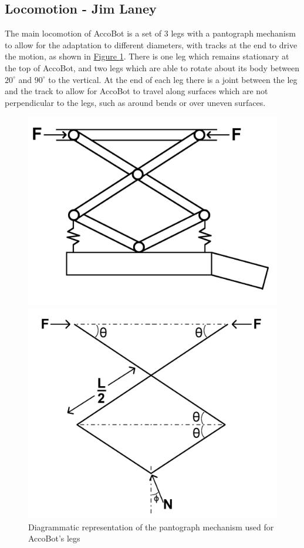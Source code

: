 \documentclass[11pt]{article}		%
\newlength{\imageheight}	 %
\newcommand{\figref}[1]{\hyperref[#1]{Figure \ref*{#1}}}    %
\begin{document}
		\subsection[Locomotion]{Locomotion - Jim Laney}
			The main locomotion of AccoBot is a set of 3 legs with a pantograph mechanism  to allow for the adaptation to different diameters, with tracks at the end to drive the motion, as shown in \figref{legDesign}.
			There is one leg which remains stationary at the top of AccoBot, and two legs which are able to rotate about its body between $20^\circ$ and $90^\circ$ to the vertical.
			At the end of each leg there is a joint between the leg and the track to allow for AccoBot to travel along surfaces which are not perpendicular to the legs, such as around bends or over uneven surfaces.
			\begin{figure}[h]
				\centering
				\begin{multicols}{2}
					\includegraphics[height=\imageheight]{legDesign}
					\caption{Diagrammatic representation of the pantograph mechanism used for AccoBot's legs}
					\label{legDesign}
					\columnbreak
					\includegraphics[height=\imageheight]{legDiagram}

\end{multicols}
\end{figure}
\end{document}
